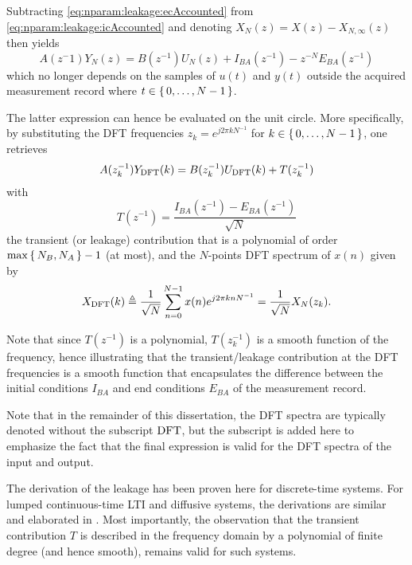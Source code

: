 \documentclass{responseletter}
\begin{document}
\begin{enumerate}
\begin{newquote}
Subtracting \eqref{eq:nparam:leakage:ecAccounted} from \eqref{eq:nparam:leakage:icAccounted} and denoting $X_N(z) = X(z) - X_{N,\infty}(z)$ then yields
\begin{equation}
  A(z^-1)Y_N(z) = B(z^{-1}) U_N(z) + I_{BA}(z^{-1}) - z^{-N}E_{BA}(z^{-1})
\end{equation}
which no longer depends on the samples of $u(t)$ and $y(t)$ outside the acquired measurement record where $t \in \set{0,\ldots,N-1}$.

The latter expression can hence be evaluated on the unit circle.
More specifically, by substituting the \gls{DFT} frequencies $z_k = e^{j2\pi k N^{-1}}$ for $k \in\set{0,\ldots,N-1}$, one retrieves
\begin{equation}
  A(z_k^{-1}) Y_{\operatorname{\mathrm{DFT}}}(k) = B(z_k^{-1}) U_{\operatorname{\mathrm{DFT}}}(k) + T(z_k^{-1})
\end{equation}
with 
\begin{equation}
T(z^{-1}) = \frac{I_{BA}(z^{-1}) - E_{BA}(z^{-1})}{\sqrt{N}}
\end{equation}
the transient (or leakage) contribution that is a polynomial of order $\max\set{\ensuremath{N_{B}}, \ensuremath{N_{A}}} -1$ (at most), and the $N$-points \gls{DFT} spectrum of $x(n)$ given by
\begin{equation}
  X_{\operatorname{\mathrm{DFT}}}(k) \triangleq \frac{1}{\sqrt{N}} \sum_{n=0}^{N-1} x(n) e^{j 2 \pi k n N^{-1}} = \frac{1}{\sqrt{N}} X_N(z_k)
  \text{.}
\end{equation}

Note that since $T(z^{-1})$ is a polynomial, $T(z_k^{-1})$ is a smooth function of the frequency, hence illustrating that the transient/leakage contribution at the \gls{DFT} frequencies is a smooth function that encapsulates the difference between the initial conditions $I_{BA}$ and end conditions $E_{BA}$ of the measurement record.

\begin{remark}
Note that in the remainder of this dissertation, the \gls{DFT} spectra are typically denoted without the subscript $\operatorname{\mathrm{DFT}}$, but the subscript is added here to emphasize the fact that the final expression is valid for the \gls{DFT} spectra of the input and output.
\end{remark}


\begin{remark}
The derivation of the leakage has been proven here for discrete-time systems.
For lumped continuous-time \gls{LTI} and diffusive systems, the derivations are similar and elaborated in \citet[Appendix 6.B]{Pintelon2012}.
Most importantly, the observation that the transient contribution $T$ is described in the frequency domain by a polynomial of finite degree (and hence smooth), remains valid for such systems.
\end{remark}
  \end{newquote}
\end{enumerate}

\newpage
\printbibliography[heading=bibintoc]
\end{document}
